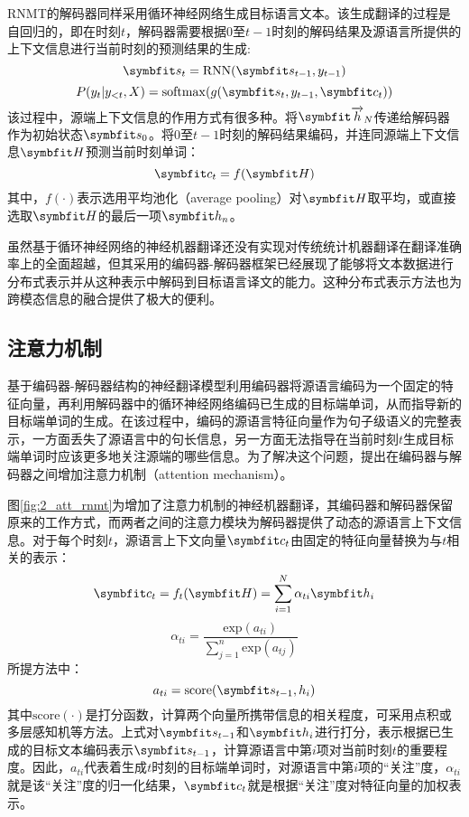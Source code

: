 RNMT的解码器同样采用循环神经网络生成目标语言文本。该生成翻译的过程是自回归的，即在时刻$t$，解码器需要根据$0$至$t-1$时刻的解码结果及源语言所提供的上下文信息进行当前时刻的预测结果的生成:
\begin{equation}
    \Vector{s}_t=\mathrm{RNN}(\Vector{s_{t-1}},y_{t-1})
\end{equation}
\begin{equation}
    P(y_t|y_{<t},X)=\mathrm{softmax}(g(\Vector{s_t}, y_{t-1}, \Vector{c_t}))
\end{equation}
该过程中，源端上下文信息的作用方式有很多种。将$\rarwvec{h}_N$传递给解码器作为初始状态$\Vector{s_0}$。将$0$至$t-1$时刻的解码结果编码，并连同源端上下文信息$\Vector{H}$预测当前时刻单词：
\begin{equation}
    \Vector{c_t}=f(\Vector{H})
\end{equation}
其中，$f(\cdot)$表示选用平均池化（average pooling）对$\Vector{H}$取平均，或直接选取$\Vector{H}$的最后一项$\Vector{h_n}$。

虽然基于循环神经网络的神经机器翻译还没有实现对传统统计机器翻译在翻译准确率上的全面超越，但其采用的编码器-解码器框架已经展现了能够将文本数据进行分布式表示并从这种表示中解码到目标语言译文的能力。这种分布式表示方法也为跨模态信息的融合提供了极大的便利。

\subsection{注意力机制}
\label{sec:2_attention}
基于编码器-解码器结构的神经翻译模型利用编码器将源语言编码为一个固定的特征向量，再利用解码器中的循环神经网络编码已生成的目标端单词，从而指导新的目标端单词的生成。在该过程中，编码的源语言特征向量作为句子级语义的完整表示，一方面丢失了源语言中的句长信息，另一方面无法指导在当前时刻$t$生成目标端单词时应该更多地关注源端的哪些信息。为了解决这个问题，提出在编码器与解码器之间增加注意力机制（attention mechanism）。


图\ref{fig:2_att_rnmt}为增加了注意力机制的神经机器翻译，其编码器和解码器保留原来的工作方式，而两者之间的注意力模块为解码器提供了动态的源语言上下文信息。对于每个时刻$t$，源语言上下文向量$\Vector{c_t}$由固定的特征向量替换为与$t$相关的表示：
\begin{equation}
    \Vector{c_t} = f_t(\Vector{H})=\sum_{i=1}^{N}{\alpha}_{ti}\Vector{h_i}
\end{equation}
\begin{equation}
    {\alpha}_{ti}=\frac{\mathrm{exp}(a_{ti})}{\sum_{j=1}^{n}\mathrm{exp}(a_{tj})}
\end{equation}
所提方法中：
\begin{equation}
    a_{ti} = \mathrm{score}(\Vector{s_{t-1},h_i})
\end{equation}
其中$\mathrm{score}(\cdot)$是打分函数，计算两个向量所携带信息的相关程度，可采用点积或多层感知机等方法。上式对$\Vector{s_{t-1}}$和$\Vector{h_i}$进行打分，表示根据已生成的目标文本编码表示$\Vector{s_{t-1}}$，计算源语言中第$i$项对当前时刻$t$的重要程度。因此，$a_{ti}$代表着生成$t$时刻的目标端单词时，对源语言中第$i$项的“关注”度，${\alpha}_{ti}$就是该“关注”度的归一化结果，$\Vector{c_t}$就是根据“关注”度对特征向量的加权表示。

